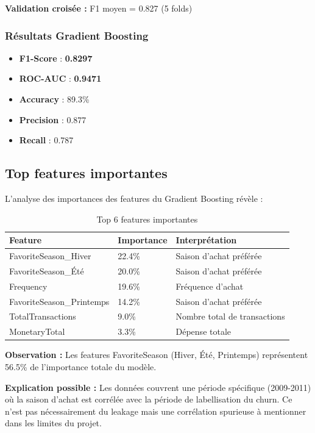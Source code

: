 \documentclass[11pt,a4paper]{article}
\begin{document}
\textbf{Validation croisée :} F1 moyen = 0.827 (5 folds)

\subsubsection{Résultats Gradient Boosting}
\begin{tcolorbox}[title=�� Modèle final retenu, colback=successgreen!10]
\begin{itemize}
    \item \textbf{F1-Score} : \textbf{0.8297}
    \item \textbf{ROC-AUC} : \textbf{0.9471}
    \item \textbf{Accuracy} : 89.3\%
    \item \textbf{Precision} : 0.877
    \item \textbf{Recall} : 0.787
\end{itemize}
\end{tcolorbox}

\subsection{Top features importantes}
L'analyse des importances des features du Gradient Boosting révèle :

\begin{table}[H]
\centering
\begin{tabular}{L{5cm} C{3cm} C{3cm}}
\toprule
\textbf{Feature} & \textbf{Importance} & \textbf{Interprétation} \\
\midrule
FavoriteSeason\_Hiver & 22.4\% & Saison d'achat préférée \\
FavoriteSeason\_Été & 20.0\% & Saison d'achat préférée \\
Frequency & 19.6\% & Fréquence d'achat \\
FavoriteSeason\_Printemps & 14.2\% & Saison d'achat préférée \\
TotalTransactions & 9.0\% & Nombre total de transactions \\
MonetaryTotal & 3.3\% & Dépense totale \\
\bottomrule
\end{tabular}
\caption{Top 6 features importantes}
\end{table}

\begin{tcolorbox}[title=�� Analyse des features importantes, colback=infoBlue!10]
\textbf{Observation :} Les features FavoriteSeason (Hiver, Été, Printemps) représentent 
56.5\% de l'importance totale du modèle.

\textbf{Explication possible :} Les données couvrent une période spécifique (2009-2011) 
où la saison d'achat est corrélée avec la période de labellisation du churn. 
Ce n'est pas nécessairement du leakage mais une corrélation spurieuse à mentionner 
dans les limites du projet.
\end{tcolorbox}
\end{document}
